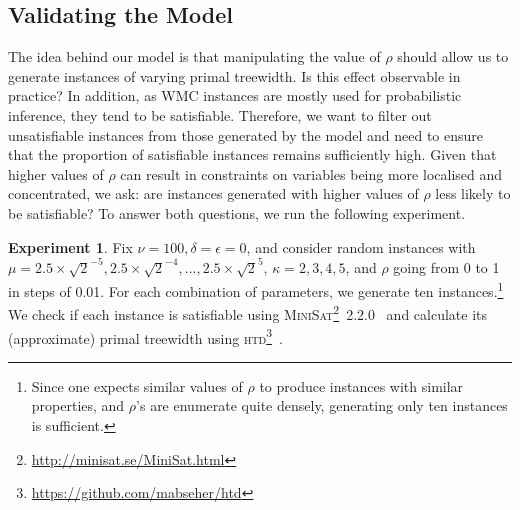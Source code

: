 \documentclass{article}
\theoremstyle{definition}
\newtheorem{experiment}{Experiment}
\begin{document}




\subsection{Validating the Model}\label{sec:remarks}

The idea behind our model is that manipulating the value of $\rho$ should allow
us to generate instances of varying primal treewidth. Is this effect observable
in practice? In addition, as \textsf{WMC} instances are mostly used for
probabilistic inference, they tend to be satisfiable. Therefore, we want to
filter out unsatisfiable instances from those generated by the model and need to
ensure that the proportion of satisfiable instances remains sufficiently high.
Given that higher values of $\rho$ can result in constraints on variables being
more localised and concentrated, we ask: are instances generated with higher
values of $\rho$ less likely to be satisfiable? To answer both questions, we run
the following experiment.

\begin{experiment}\label{exp:regular_satisfiability}
  Fix $\nu = 100, \delta = \epsilon = 0$, and consider random instances with
  $\mu = 2.5 \times \sqrt{2}^{-5}, 2.5 \times \sqrt{2}^{-4}, \dots, 2.5 \times
  \sqrt{2}^5$, $\kappa = 2, 3, 4, 5$, and $\rho$ going from 0 to 1 in steps of
  0.01. For each combination of parameters, we generate ten instances.\footnote{Since one expects similar values of $\rho$ to produce instances with similar properties, and $\rho$'s are enumerate quite densely, generating only ten instances is sufficient.} We check if each instance is satisfiable using \textsc{MiniSat}\footnote{\url{http://minisat.se/MiniSat.html}}~2.2.0~\cite{DBLP:conf/sat/EenS03} and calculate its (approximate) primal treewidth using \textsc{htd}\footnote{\url{https://github.com/mabseher/htd}}~\cite{DBLP:conf/cpaior/AbseherMW17}.
\end{experiment}
\end{document}
